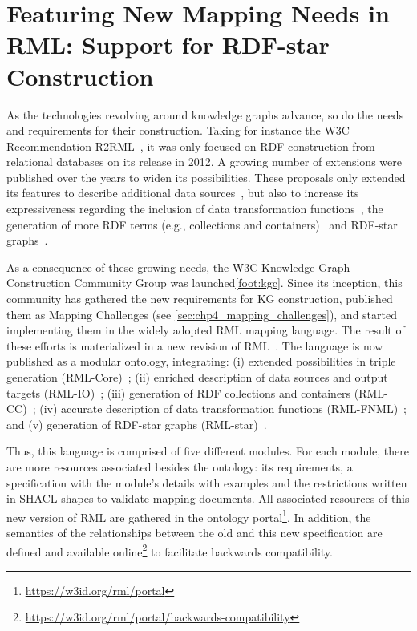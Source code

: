\section{Featuring New Mapping Needs in RML: Support for RDF-star Construction}
\label{sec:chp4_rml_star}

As the technologies revolving around knowledge graphs advance, so do the needs and requirements for their construction. Taking for instance the W3C Recommendation R2RML~\parencite{das2012r2rml}, it was only focused on RDF construction from relational databases on its release in 2012. A growing number of extensions were published over the years to widen its possibilities. These proposals only extended its features to describe additional data sources~\parencite{DBLP:conf/webist/MichelDFM15,VanAssche2021LeveragingWebThings}, but also to increase its expressiveness regarding the inclusion of data transformation functions~\parencite{de2020implementation,debruyne2016r2rmlf,junior2016funul,kyzirakos2018geotriples}, the generation of more RDF terms (e.g., collections and containers)~\parencite{DBLP:conf/webist/MichelDFM15,debruyne2017R2RML-collections} and RDF-star graphs~\parencite{delva2021rml-star,sundqvist2022extending}. 

As a consequence of these growing needs, the W3C Knowledge Graph Construction Community Group was launched\cref{foot:kgc}. 
Since its inception, this community has gathered the new requirements for KG construction, published them as Mapping Challenges (see \cref{sec:chp4_mapping_challenges}), and started implementing them in the widely adopted RML mapping language. 
The result of these efforts is materialized in a new revision of RML~\parencite{iglesias2023rml}. 
The language is now published as a modular ontology, integrating: (i) extended possibilities in triple generation (RML-Core)~\parencite{core_ontology}; (ii) enriched description of data sources and output targets (RML-IO)~\parencite{io_ontology}; (iii) generation of RDF collections and containers (RML-CC)~\parencite{cc_ontology}; (iv) accurate description of data transformation functions (RML-FNML)~\parencite{fnml_ontology}; and (v) generation of RDF-star graphs (RML-star)~\parencite{star_ontology}.

Thus, this language is comprised of five different modules. 
For each module, there are more resources associated besides the ontology: its requirements, a specification with the module's details with examples and the restrictions written in SHACL shapes to validate mapping documents. 
All associated resources of this new version of RML are gathered in the ontology portal\footnote{\url{https://w3id.org/rml/portal}}. 
In addition, the semantics of the relationships between the old and this new specification are defined and available online\footnote{\url{https://w3id.org/rml/portal/backwards-compatibility}} to facilitate backwards compatibility.

